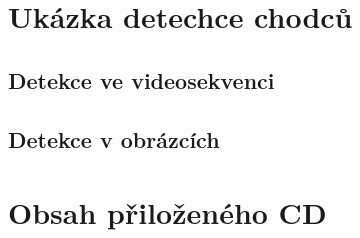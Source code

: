 \section{Ukázka detechce chodců}
\subsection{Detekce ve videosekvenci}
\subsection{Detekce v obrázcích}
\section{Obsah přiloženého CD}
